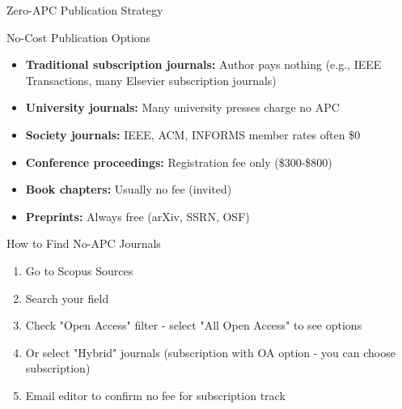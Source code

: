 \documentclass[11pt]{beamer}
\begin{document}
	\begin{frame}{Zero-APC Publication Strategy}
		\scriptsize
		\begin{block}{No-Cost Publication Options}
			\begin{itemize}
				\item \textbf{Traditional subscription journals:} Author pays nothing (e.g., IEEE Transactions, many Elsevier subscription journals)
				\item \textbf{University journals:} Many university presses charge no APC
				\item \textbf{Society journals:} IEEE, ACM, INFORMS member rates often \$0
				\item \textbf{Conference proceedings:} Registration fee only (\$300-\$800)
				\item \textbf{Book chapters:} Usually no fee (invited)
				\item \textbf{Preprints:} Always free (arXiv, SSRN, OSF)
			\end{itemize}
		\end{block}
		\begin{block}{How to Find No-APC Journals}
			\begin{enumerate}
				\item Go to Scopus Sources
				\item Search your field
				\item Check "Open Access" filter - select "All Open Access" to see options
				\item Or select "Hybrid" journals (subscription with OA option - you can choose subscription)
				\item Email editor to confirm no fee for subscription track
			\end{enumerate}
		\end{block}
	\end{frame}
	
\end{document}
